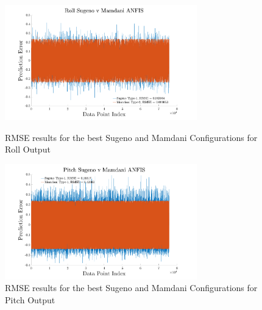 \begin{figure}[H]
    \centering
    \begin{minipage}[b]{0.45\textwidth}
        \centering
        \includegraphics[height=5cm,keepaspectratio]{img/Roll SvM.pdf}
        \caption{RMSE results for the best Sugeno and Mamdani Configurations for Roll Output}
        \label{fig:roll_SvM}
    \end{minipage}
    \hfill
    \begin{minipage}[b]{0.45\textwidth}
        \centering
        \includegraphics[height=5cm,keepaspectratio]{img/Pitch SvM.pdf}
        \caption{RMSE results for the best Sugeno and Mamdani Configurations for Pitch Output}
        \label{fig:pitch_SvM}
    \end{minipage}
\end{figure}
